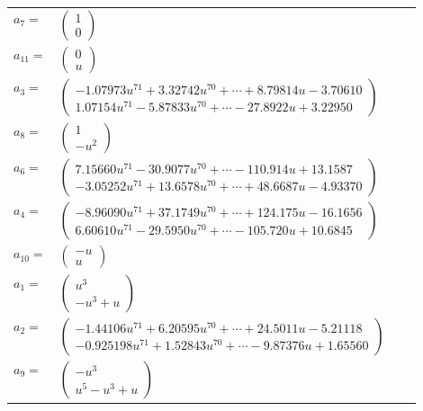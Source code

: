 \documentclass[1p]{elsarticle_modified}
\theoremstyle{definition}
\begin{document}
\begin{tabular}{m{7pt} m{180pt} m{7pt} m{180pt} }
\flushright $a_{7}=$&$\begin{pmatrix}1\\0\end{pmatrix}$ \\
\flushright $a_{11}=$&$\begin{pmatrix}0\\u\end{pmatrix}$ \\
\flushright $a_{3}=$&$\begin{pmatrix}-1.07973 u^{71}+3.32742 u^{70}+\cdots+8.79814 u-3.70610\\1.07154 u^{71}-5.87833 u^{70}+\cdots-27.8922 u+3.22950\end{pmatrix}$ \\
\flushright $a_{8}=$&$\begin{pmatrix}1\\- u^2\end{pmatrix}$ \\
\flushright $a_{6}=$&$\begin{pmatrix}7.15660 u^{71}-30.9077 u^{70}+\cdots-110.914 u+13.1587\\-3.05252 u^{71}+13.6578 u^{70}+\cdots+48.6687 u-4.93370\end{pmatrix}$ \\
\flushright $a_{4}=$&$\begin{pmatrix}-8.96090 u^{71}+37.1749 u^{70}+\cdots+124.175 u-16.1656\\6.60610 u^{71}-29.5950 u^{70}+\cdots-105.720 u+10.6845\end{pmatrix}$ \\
\flushright $a_{10}=$&$\begin{pmatrix}- u\\u\end{pmatrix}$ \\
\flushright $a_{1}=$&$\begin{pmatrix}u^3\\- u^3+u\end{pmatrix}$ \\
\flushright $a_{2}=$&$\begin{pmatrix}-1.44106 u^{71}+6.20595 u^{70}+\cdots+24.5011 u-5.21118\\-0.925198 u^{71}+1.52843 u^{70}+\cdots-9.87376 u+1.65560\end{pmatrix}$ \\
\flushright $a_{9}=$&$\begin{pmatrix}- u^3\\u^5- u^3+u\end{pmatrix}$ \\

\end{tabular}
\end{document}
